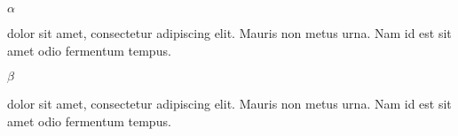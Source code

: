 \documentclass[a4paper,10.5pt,twoside,openwright,makeidx,final,oldfontcommands]{memoir}
\begin{document}
\thispagestyle{empty}
\Columns
\begin{pairs}
\begin{Leftside}
\beginnumbering
\begin{center}
\pstart
$\alpha{}$
\vspace{1cm}
\pend
\end{center}
\pstart
\noindent
{} dolor sit amet, consectetur adipiscing elit. 
\pend
\pstart
Mauris non metus urna. Nam id est sit amet odio fermentum tempus. 
\pend
\endnumbering
\end{Leftside}

\begin{Rightside}
\beginnumberingR
\begin{center}
\pstart
$\beta{}$
\vspace{1cm}
\pend
\end{center}
\pstart
\noindent
{} dolor sit amet, consectetur adipiscing elit. 
\pend
\pstart
Mauris non metus urna. Nam id est sit amet odio fermentum tempus. 
\pend
\endnumberingR
\end{Rightside}
\end{pairs}
\Columns
\end{document}

